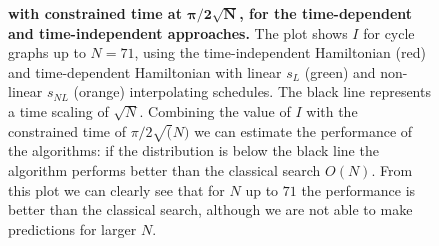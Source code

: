 
\begin{figure}[ht]
  \centering
  \caption{\textbf{ with constrained time at $\bm{\pi/2\sqrt{N}}$, for the time-dependent and time-independent approaches.} The plot shows $I$ for cycle graphs up to $N=71$, using the time-independent Hamiltonian (red) and time-dependent Hamiltonian with linear $s_L$ (green) and non-linear $s_{NL}$ (orange) interpolating schedules. The black line represents a time scaling of $\sqrt{N}$. Combining the value of $I$ with the constrained time of $\pi/2\sqrt(N)$ we can estimate the performance of the algorithms: if the distribution is below the black line the algorithm performs better than the classical search $O(N)$. From this plot we can clearly see that for $N$ up to $71$ the performance is better than the classical search, although we are not able to make predictions for larger $N$.}
  \label{fig:iters_independent_dependent}
\end{figure}
